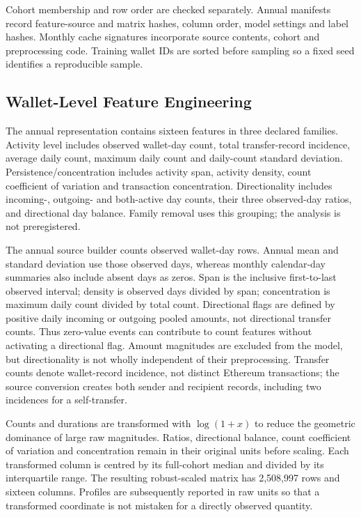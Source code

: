 Cohort membership and row order are checked separately. Annual manifests record feature-source and matrix hashes, column order, model settings and label hashes. Monthly cache signatures incorporate source contents, cohort and preprocessing code. Training wallet IDs are sorted before sampling so a fixed seed identifies a reproducible sample.

\subsection{Wallet-Level Feature Engineering}
The annual representation contains sixteen features in three declared families. Activity level includes observed wallet-day count, total transfer-record incidence, average daily count, maximum daily count and daily-count standard deviation. Persistence/concentration includes activity span, activity density, count coefficient of variation and transaction concentration. Directionality includes incoming-, outgoing- and both-active day counts, their three observed-day ratios, and directional day balance. Family removal uses this grouping; the analysis is not preregistered.

The annual source builder counts observed wallet-day rows. Annual mean and standard deviation use those observed days, whereas monthly calendar-day summaries also include absent days as zeros. Span is the inclusive first-to-last observed interval; density is observed days divided by span; concentration is maximum daily count divided by total count. Directional flags are defined by positive daily incoming or outgoing pooled amounts, not directional transfer counts. Thus zero-value events can contribute to count features without activating a directional flag. Amount magnitudes are excluded from the model, but directionality is not wholly independent of their preprocessing. Transfer counts denote wallet-record incidence, not distinct Ethereum transactions; the source conversion creates both sender and recipient records, including two incidences for a self-transfer.

Counts and durations are transformed with $\log(1+x)$ to reduce the geometric dominance of large raw magnitudes. Ratios, directional balance, count coefficient of variation and concentration remain in their original units before scaling. Each transformed column is centred by its full-cohort median and divided by its interquartile range. The resulting robust-scaled matrix has 2,508,997 rows and sixteen columns. Profiles are subsequently reported in raw units so that a transformed coordinate is not mistaken for a directly observed quantity.

